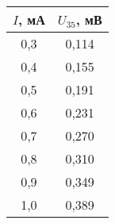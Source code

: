 \begin{tabular}{cc}
\toprule
$I$, мА & $U_{35}$, мВ \\
\midrule
0,3 & 0,114 \\
0,4 & 0,155 \\
0,5 & 0,191 \\
0,6 & 0,231 \\
0,7 & 0,270 \\
0,8 & 0,310 \\
0,9 & 0,349 \\
1,0 & 0,389 \\
\bottomrule
\end{tabular}
